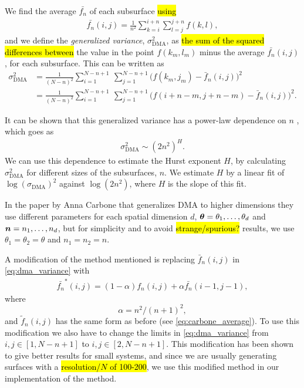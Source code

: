 We find the average $\bar {f_n}$ of each subsurface \hl{using}
\begin{align}
    \bar {f_n}(i,j) = \frac{1}{n^2} \sum_{k = i}^{i+n} \sum_{l = j}^{j+n} f(k,l),
    \label{eq:carbone_average}
\end{align}
and we define the \emph{generalized variance}, $\sigma_\text{DMA}^2$, as \hl{the sum of the squared differences between} the value in the point $f(k_m,l_m)$ minus the average $\bar {f_n}(i,j)$, for each subsurface. This can be written as
\begin{align}
    \sigma_\text{DMA}^2 
    &= \frac{1}{(N-n)^2}\sum_{i=1}^{N-n+1} ~ \sum_{j=1}^{N-n+1} 
    \big(
        f(k_m,j_m) - \bar f_n(i,j)
    \big)^2%
    \nonumber\\%
    &= \frac{1}{(N-n)^2}\sum_{i=1}^{N-n+1} ~ \sum_{j=1}^{N-n+1} 
    \big(
        f(i+n-m,j+n-m) - \bar f_n(i,j)
    \big)^2.
    \label{eq:dma_variance}
\end{align}

It can be shown that this generalized variance has a power-law dependence on $n$ \cite{alessio2002dma,carbone2007algorithm}, which goes as
\begin{align*}
    \sigma_\text{DMA}^2 \sim \left(2n^2\right)^H.
\end{align*}
We can use this dependence to estimate the Hurst exponent $H$, by calculating $\sigma_\text{DMA}^2$ for different sizes of the subsurfaces, $n$. We estimate $H$ by a linear fit of $\log \left(\sigma_\text{DMA}\right)^2$ against $\log \left(2n^2 \right)$, where $H$ is the slope of this fit.

In the paper by Anna Carbone that generalizes DMA to higher dimensions\cite{carbone2007algorithm} they use different parameters for each spatial dimension $d$, $\boldsymbol{\theta} = \theta_1, \dots, \theta_d$ and $\boldsymbol{n} = n_1, \dots, n_d$, but for simplicity and to avoid \hl{strange/spurious?} results, we use $\theta_1 = \theta_2 = \theta$ and $n_1 = n_2 = n$.

A modification of the method mentioned is replacing $\bar f_n(i,j)$ in \cref{eq:dma_variance} with
\begin{align*}
    \bar {f_n}^*(i,j) = (1-\alpha) f_n(i,j) + \alpha \bar {f_n}(i-1,j-1),
\end{align*}
where
\[
    \alpha = n^2/(n+1)^2,
\]
and $\tilde f_n(i,j)$ has the same form as before (see \cref{eq:carbone_average}). To use this modification we also have to change the limits in \cref{eq:dma_variance} from ${i,j\in [1,N-n+1]}$ to $i,j\in [2,N-n+1]$. This modification has been shown to give better results for small systems\cite{carbone2007algorithm}, and since we are usually generating surfaces with a \hl{resolution/$N$ of 100-200}, we use this modified method in our implementation of the method. 

